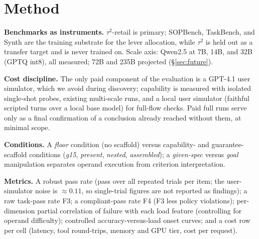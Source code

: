 \section{Method}\label{sec:method}
\textbf{Benchmarks as instruments.} $\tau^2$-retail is primary; SOPBench, TaskBench, and Synth are the training substrate for the lever allocation, while $\tau^2$ is held out as a transfer target and is never trained on. Scale axis: Qwen2.5 at 7B, 14B, and 32B (GPTQ int8), all measured; 72B and 235B projected (\S\ref{sec:future}).

\textbf{Cost discipline.} The only paid component of the evaluation is a GPT-4.1 user simulator, which we avoid during discovery; capability is measured with isolated single-shot probes, existing multi-scale runs, and a local user simulator (faithful scripted turns over a local base model) for full-flow checks. Paid full runs serve only as a final confirmation of a conclusion already reached without them, at minimal scope.

\textbf{Conditions.} A \emph{floor} condition (no scaffold) versus capability- and guarantee-scaffold conditions (\emph{g15}, \emph{present}, \emph{nested}, \emph{assembled}); a \emph{given-spec} versus \emph{goal} manipulation separates operand execution from criterion interpretation.

\textbf{Metrics.} A robust pass rate (pass over all repeated trials per item; the user-simulator noise is $\approx0.11$, so single-trial figures are not reported as findings); a raw task-pass rate F3; a compliant-pass rate F4 (F3 less policy violations); per-dimension partial correlation of failure with each load feature (controlling for operand difficulty); controlled accuracy-versus-load onset curves; and a cost row per cell (latency, tool round-trips, memory and GPU tier, cost per request).
